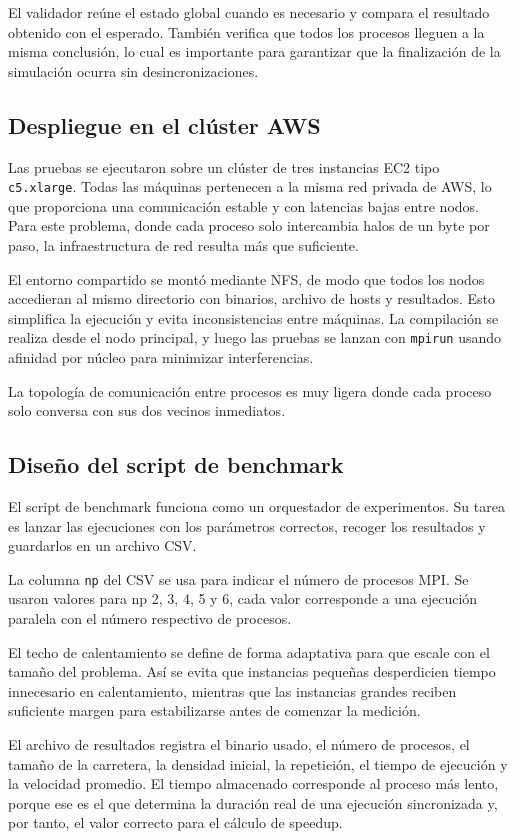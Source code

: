 El validador reúne el estado global cuando es necesario y compara el resultado obtenido con el esperado. También verifica que todos los procesos lleguen a la misma conclusión, lo cual es importante para garantizar que la finalización de la simulación ocurra sin desincronizaciones.

\subsection{Despliegue en el clúster AWS}

Las pruebas se ejecutaron sobre un clúster de tres instancias EC2 tipo \texttt{c5.xlarge}. Todas las máquinas pertenecen a la misma red privada de AWS, lo que proporciona una comunicación estable y con latencias bajas entre nodos. Para este problema, donde cada proceso solo intercambia halos de un byte por paso, la infraestructura de red resulta más que suficiente.

El entorno compartido se montó mediante NFS, de modo que todos los nodos accedieran al mismo directorio con binarios, archivo de hosts y resultados. Esto simplifica la ejecución y evita inconsistencias entre máquinas. La compilación se realiza desde el nodo principal, y luego las pruebas se lanzan con \texttt{mpirun} usando afinidad por núcleo para minimizar interferencias.

La topología de comunicación entre procesos es muy ligera donde cada proceso solo conversa con sus dos vecinos inmediatos.

\subsection{Diseño del script de benchmark}

El script de benchmark funciona como un orquestador de experimentos. Su tarea es lanzar las ejecuciones con los parámetros correctos, recoger los resultados y guardarlos en un archivo CSV.

La columna \texttt{np} del CSV se usa para indicar el número de procesos MPI. Se usaron valores para np 2, 3, 4, 5 y 6, cada valor corresponde a una ejecución paralela con el número respectivo de procesos.

El techo de calentamiento se define de forma adaptativa para que escale con el tamaño del problema. Así se evita que instancias pequeñas desperdicien tiempo innecesario en calentamiento, mientras que las instancias grandes reciben suficiente margen para estabilizarse antes de comenzar la medición.

El archivo de resultados registra el binario usado, el número de procesos, el tamaño de la carretera, la densidad inicial, la repetición, el tiempo de ejecución y la velocidad promedio. El tiempo almacenado corresponde al proceso más lento, porque ese es el que determina la duración real de una ejecución sincronizada y, por tanto, el valor correcto para el cálculo de speedup.